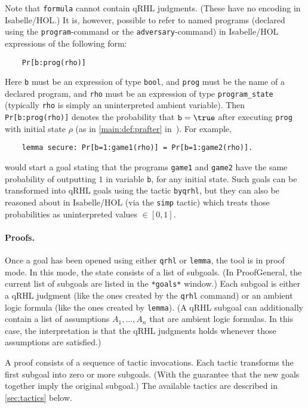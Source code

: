\documentclass{article}
\newcommand\qrhlautoref[1]{\autoref{main:#1} in~\cite{qrhl-paper-from-manual}}
\begin{document}
Note that \texttt{formula} cannot contain qRHL judgments. (These have
no encoding in Isabelle/HOL.) It is, however, possible to refer to
named programs (declared using the \texttt{program}-command or the
\texttt{adversary}-command) in Isabelle/HOL expressions of the
following form:
\begin{center}
  \begin{lstlisting}
    Pr[b:prog(rho)]
  \end{lstlisting}
\end{center}
Here \texttt{b} must be an expression of type \texttt{bool},
and \texttt{prog} must be the name of a
declared program, and \texttt{rho} must be an expression of type
\texttt{program\_state} (typically \texttt{rho} is simply an
uninterpreted ambient variable).  Then \texttt{Pr[b:prog(rho)]} 
denotes the probability that $\mathtt{b}=\true$
after executing \texttt{prog} with initial state $\rho$
(as in \qrhlautoref{def:prafter}).  For example,
\begin{center}
  \begin{lstlisting}
    lemma secure: Pr[b=1:game1(rho)] = Pr[b=1:game2(rho)].
  \end{lstlisting}
\end{center}
would start a goal stating that the programs \texttt{game1} and
\texttt{game2} have the same probability of outputting $1$
in variable \texttt{b}, for any initial state. Such goals can be
transformed into qRHL goals using the tactic \texttt{byqrhl}, but they
can also be reasoned about in Isabelle/HOL (via the \texttt{simp}
tactic) which treats those probabilities as uninterpreted values $\in[0,1]$.


\paragraph{Proofs.} Once a goal has been opened using either
\texttt{qrhl} or \texttt{lemma}, the tool is in proof mode. In this
mode, the state consists of a list of subgoals. (In ProofGeneral, the
current list of subgoals are listed in the \texttt{*goals*} window.)
Each subgoal is either a qRHL judgment (like the ones created by the
\texttt{qrhl} command) or an ambient logic formula (like the ones
created by \texttt{lemma}). (A qRHL subgoal can additionally contain a
list of assumptions $A_1,\dots,A_n$
that are ambient logic formulas. In this case, the interpretation is
that the qRHL judgments holds whenever those assumptions are satisfied.)

A proof consists of a sequence of tactic invocations. Each tactic
transforms the first subgoal into zero or more subgoals.  (With the
guarantee that the new goals together imply the original subgoal.)
The available tactics are described in \autoref{sec:tactics} below.
\end{document}
